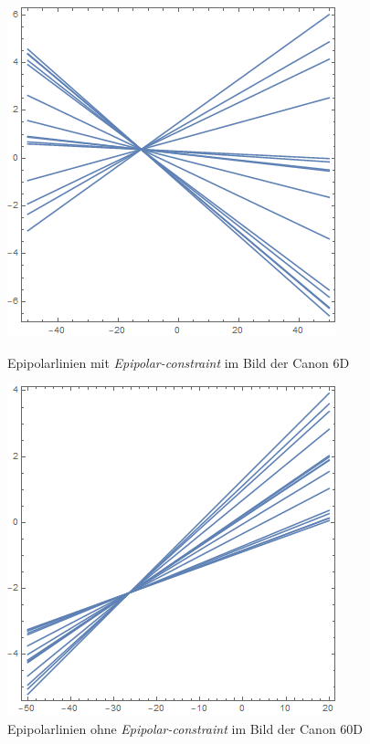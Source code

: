 \begin{figure}[!htb]
	\includegraphics[width=\linewidth]{images/L_PC1_F_Constraint.png}
	\caption{Epipolarlinien mit \textit{Epipolar-constraint} im Bild der Canon 6D}
	\label{fig:awesome_image1}
	\endminipage\hfill
	\includegraphics[width=\linewidth]{images/LPrime_PC2_F_Constraint.png}
	\caption{Epipolarlinien ohne \textit{Epipolar-constraint} im Bild der Canon 60D}
	\label{fig:awesome_image2}
	\endminipage\hfill
\end{figure}

